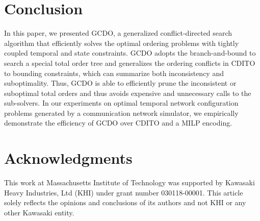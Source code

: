 \documentclass[letterpaper]{article} %
\theoremstyle{definition}
\begin{document}
\section{Conclusion}
\label{sec:conclusion}

In this paper, we presented GCDO, a generalized conflict-directed search algorithm that efficiently solves the optimal ordering problems with tightly coupled temporal and state constraints. GCDO adopts the branch-and-bound to search a special total order tree and generalizes the ordering conflicts in CDITO to bounding constraints, which can summarize both inconsistency and suboptimality. Thus, GCDO is able to efficiently prune the inconsistent or suboptimal total orders and thus avoids expensive and unnecessary calls to the sub-solvers. In our experiments on optimal temporal network configuration problems generated by a communication network simulator, we empirically demonstrate the efficiency of GCDO over CDITO and a MILP encoding.


\section*{Acknowledgments}
This work at Massachusetts Institute of Technology was supported by Kawasaki Heavy Industries, Ltd (KHI) under grant number 030118-00001. This article solely reflects the opinions and conclusions of its authors and not KHI or any other Kawasaki entity.

\small{}
\end{document}
